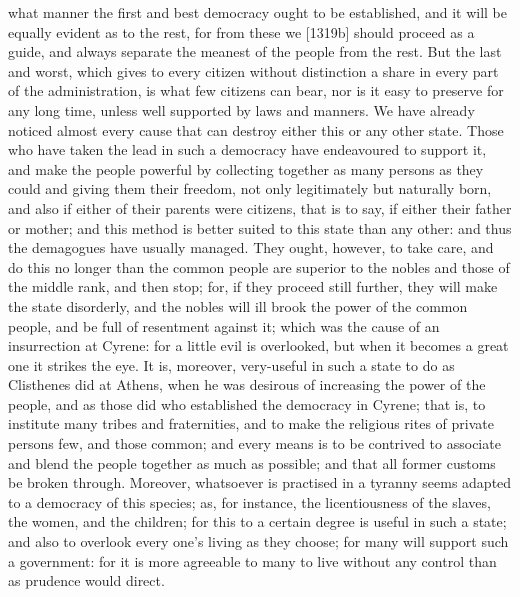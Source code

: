what manner the first and best democracy ought to be established, and it
will be equally evident as to the rest, for from these we [1319b] should
proceed as a guide, and always separate the meanest of the people from the
rest. But the last and worst, which gives to every citizen without
distinction a share in every part of the administration, is what few
citizens can bear, nor is it easy to preserve for any long time, unless
well supported by laws and manners. We have already noticed almost every
cause that can destroy either this or any other state. Those who have
taken the lead in such a democracy have endeavoured to support it, and
make the people powerful by collecting together as many persons as they
could and giving them their freedom, not only legitimately but naturally
born, and also if either of their parents were citizens, that is to say,
if either their father or mother; and this method is better suited to this
state than any other: and thus the demagogues have usually managed. They
ought, however, to take care, and do this no longer than the common people
are superior to the nobles and those of the middle rank, and then stop;
for, if they proceed still further, they will make the state disorderly,
and the nobles will ill brook the power of the common people, and be full
of resentment against it; which was the cause of an insurrection at
Cyrene: for a little evil is overlooked, but when it becomes a great one
it strikes the eye. It is, moreover, very-useful in such a state to do as
Clisthenes did at Athens, when he was desirous of increasing the power of
the people, and as those did who established the democracy in Cyrene; that
is, to institute many tribes and fraternities, and to make the religious
rites of private persons few, and those common; and every means is to be
contrived to associate and blend the people together as much as possible;
and that all former customs be broken through. Moreover, whatsoever is
practised in a tyranny seems adapted to a democracy of this species; as,
for instance, the licentiousness of the slaves, the women, and the
children; for this to a certain degree is useful in such a state; and also
to overlook every one's living as they choose; for many will support such
a government: for it is more agreeable to many to live without any control
than as prudence would direct.


